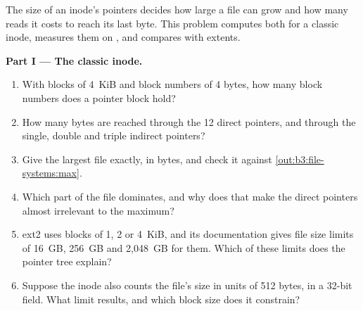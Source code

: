 \begin{problem}\label{pb:b3:file-systems:1}
The size of an inode's pointers decides how large a file can grow and how many reads it costs to reach its last byte. This problem computes both for a classic inode, measures them on , and compares with extents.

\label{lst:b3:file-systems:max}

\label{out:b3:file-systems:max}

\label{lst:b3:file-systems:reads}

\label{out:b3:file-systems:reads}

\medskip\noindent\textbf{Part I --- The classic inode.}
\begin{enumerate}
\item With blocks of 4~KiB and block numbers of 4 bytes, how many block numbers does a pointer block hold?
\item How many bytes are reached through the 12 direct pointers, and through the single, double and triple indirect pointers?
\item Give the largest file exactly, in bytes, and check it against \cref{out:b3:file-systems:max}.
\item Which part of the file dominates, and why does that make the direct pointers almost irrelevant to the maximum?
\item ext2 uses blocks of 1, 2 or 4~KiB, %
and its documentation gives file size limits of 16~GB, 256~GB and 2,048~GB for them. %
Which of these limits does the pointer tree explain?
\item Suppose the inode also counts the file's size in units of 512 bytes, in a 32-bit field. What limit results, and which block size does it constrain?
\end{enumerate}


\end{problem}
